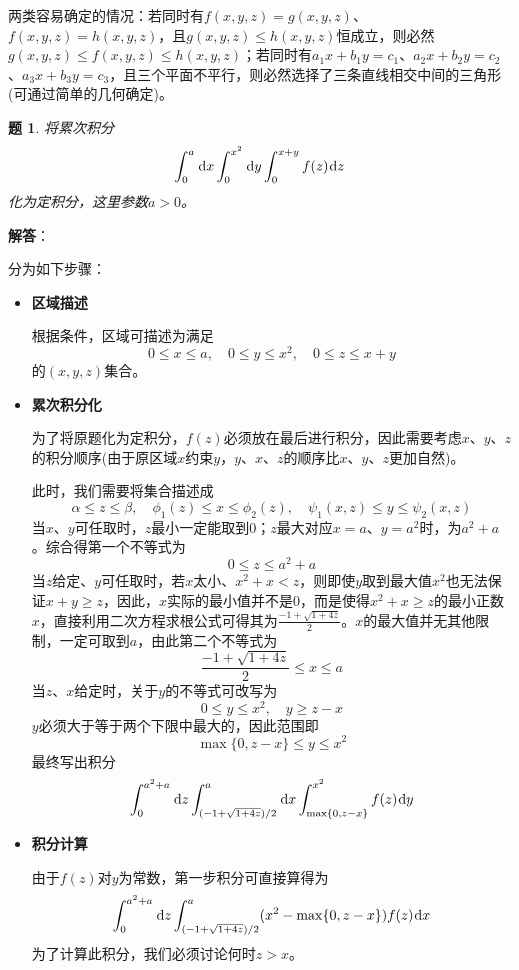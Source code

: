 \documentclass[a4paper,UTF8,fontset=windows,AutoFakeBold]{ctexart}
\newcommand*{\dr}{\hspace{0.07em}\mathrm{d}}
\newcommand*{\note}{\noindent *}
\theoremstyle{ex}
\newtheorem{exercise}{题}
\newcommand{\sol}[1]{{\vspace{5pt}\kaishu\noindent\textbf{解答}：\vspace{-3pt}
\begin{compactitem}
    \item[] #1
\end{compactitem}
}}
\begin{document}
\note 两类容易确定的情况：若同时有$f(x,y,z)=g(x,y,z)$、$f(x,y,z)=h(x,y,z)$，且$g(x,y,z)\le h(x,y,z)$恒成立，则必然$g(x,y,z)\le f(x,y,z)\le h(x,y,z)$；若同时有$a_1x+b_1y=c_1$、$a_2x+b_2y=c_2$、$a_3x+b_3y=c_3$，且三个平面不平行，则必然选择了三条直线相交中间的三角形(可通过简单的几何确定)。

\begin{framed}
\begin{exercise}
    将累次积分
    $$\int_0^a\dr x\int_0^{x^2}\dr y\int_0^{x+y}f(z)\dr z$$
    化为定积分，这里参数$a>0$。
\end{exercise}
\sol{
    分为如下步骤：
    \begin{itemize}
        \item \textbf{区域描述}
            
        根据条件，区域可描述为满足
        $$0\le x\le a,\quad0\le y\le x^2,\quad 0\le z\le x+y$$
        的$(x,y,z)$集合。

        \item \textbf{累次积分化}
            
        为了将原题化为定积分，$f(z)$必须放在最后进行积分，因此需要考虑$x$、$y$、$z$的积分顺序(由于原区域$x$约束$y$，$y$、$x$、$z$的顺序比$x$、$y$、$z$更加自然)。

        此时，我们需要将集合描述成
        $$\alpha\le z\le\beta,\quad\phi_1(z)\le x\le\phi_2(z),\quad\psi_1(x,z)\le y\le\psi_2(x,z)$$
        当$x$、$y$可任取时，$z$最小一定能取到0；$z$最大对应$x=a$、$y=a^2$时，为$a^2+a$。综合得第一个不等式为
        $$0\le z\le a^2+a$$
        当$z$给定、$y$可任取时，若$x$太小、$x^2+x<z$，则即使$y$取到最大值$x^2$也无法保证$x+y\ge z$，因此，$x$实际的最小值并不是0，而是使得$x^2+x\ge z$的最小正数$x$，直接利用二次方程求根公式可得其为$\frac{-1+\sqrt{1+4z}}{2}$。$x$的最大值并无其他限制，一定可取到$a$，由此第二个不等式为
        $$\frac{-1+\sqrt{1+4z}}{2}\le x\le a$$
        当$z$、$x$给定时，关于$y$的不等式可改写为
        $$0\le y\le x^2,\quad y\ge z-x$$
        $y$必须大于等于两个下限中最大的，因此范围即
        $$\max\{0,z-x\}\le y\le x^2$$
        最终写出积分
        $$\int_0^{a^2+a}\dr z\int_{(-1+\sqrt{1+4z})/2}^a\dr x\int_{\max\{0,z-x\}}^{x^2}f(z)\dr y$$

        \item \textbf{积分计算}
            
        由于$f(z)$对$y$为常数，第一步积分可直接算得为
        $$\int_0^{a^2+a}\dr z\int_{(-1+\sqrt{1+4z})/2}^a(x^2-\max\{0,z-x\})f(z)\dr x$$
        为了计算此积分，我们必须讨论何时$z>x$。


\end{itemize}}
\end{framed}
\end{document}
